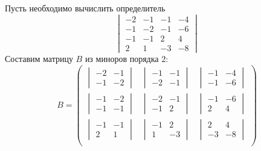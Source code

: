 \documentclass[12pt, a4paper]{article}
\begin{document}
    \begin{exmp}
        Пусть необходимо вычислить определитель \[
            \begin{vmatrix}
                -2 & -1 & -1 & -4 \\
                -1 & -2 & -1 & -6 \\
                -1 & -1 & 2 & 4 \\
                2 & 1 & -3 & -8 
            \end{vmatrix}
        \] 
        Составим матрицу \( B \) из миноров порядка \( 2 \): \[
            B = \begin{pmatrix} 
                \begin{vmatrix} -2 & -1 \\ -1 & -2\end{vmatrix} & 
                \begin{vmatrix} -1 & -1 \\ -2 & -1\end{vmatrix} &
                \begin{vmatrix} -1 & -4 \\ -1 & -6\end{vmatrix} \\[4ex]

                \begin{vmatrix} -1 & -2 \\ -1 & -1\end{vmatrix} &
                \begin{vmatrix} -2 & -1 \\ -1 & 2\end{vmatrix} &
                \begin{vmatrix} -1 & -6 \\ 2 & 4\end{vmatrix} \\[4ex]

                \begin{vmatrix} -1 & -1 \\ 2 & 1\end{vmatrix} &
                \begin{vmatrix} -1 & 2 \\ 1 & -3\end{vmatrix} &
                \begin{vmatrix} 2 & 4 \\ -3 & -8\end{vmatrix} \\


\end{pmatrix}\]
\end{exmp}
\end{document}
